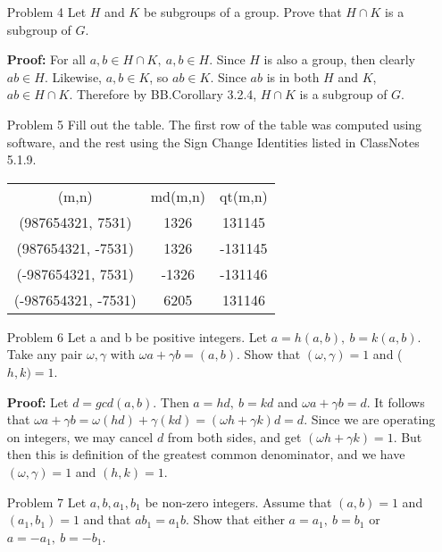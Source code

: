 \documentclass[letterpaper]{article}
\begin{document}
\begin{itemize}
      \item[Problem 4]  Let \(H\) and \(K\) be subgroups of a group. Prove that \(H \cap K\) is a subgroup of \(G\).

            \textbf{Proof: } For all \(a, b \in H \cap K,\ a, b \in H\). Since \(H\) is also a group, then clearly \(ab \in H\). Likewise, \(a, b \in K\), so \(ab \in K\). Since \(ab\) is in both \(H\) and \(K\), \(ab\in H \cap K\). Therefore by BB.Corollary 3.2.4, \(H \cap K\) is a subgroup of \(G\).

      \item[Problem 5] Fill out the table. The first row of the table was computed using software, and the rest using the Sign Change Identities listed in ClassNotes 5.1.9.
            \begin{center}
                  \begin{tabular}{ c c c }
                        (m,n)               & md(m,n) & qt(m,n) \\
                        (987654321, 7531)   & 1326    & 131145  \\
                        (987654321, -7531)  & 1326    & -131145 \\
                        (-987654321, 7531)  & -1326   & -131146 \\
                        (-987654321, -7531) & 6205    & 131146
                  \end{tabular}
            \end{center}

      \item[Problem 6]Let a and b be positive integers. Let \(a = h(a, b),\ b = k(a, b)\). Take any pair \(\omega, \gamma\) with \(\omega a + \gamma b = (a, b)\). Show that \((\omega, \gamma) = 1\)  and (\(h, k) = 1\).

            \textbf{Proof: } Let \(d = gcd(a, b)\). Then \(a = hd,\ b = kd\) and \(\omega a + \gamma b = d\). It follows that \(\omega a + \gamma b = \omega(hd) + \gamma(kd) = (\omega h + \gamma k)d = d\).
            Since we are operating on integers, we may cancel \(d\) from both sides, and get \((\omega h + \gamma k) = 1\). But then this is definition of the greatest common denominator, and we have \((\omega, \gamma) = 1\) and \((h, k) = 1\).

      \item[Problem 7] Let \(a, b, a_1, b_1\) be non-zero integers. Assume that \((a, b) = 1\) and \((a_1, b_1) = 1\) and that \(ab_1 = a_1b\). Show that either \(a = a_1,\ b = b_1\) or \(a = -a_1,\ b = -b_1\).



\end{itemize}
\end{document}
